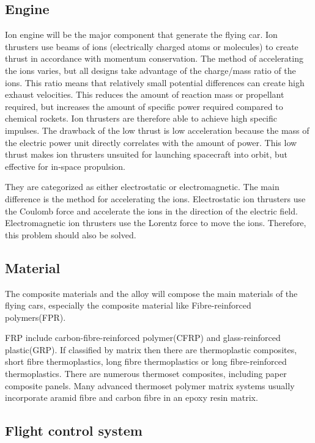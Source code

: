 \subsection{Engine}

Ion engine will be the major component that generate the flying car. Ion thrusters use beams of ions (electrically charged atoms or molecules) to create thrust in accordance with momentum conservation. The method of accelerating the ions varies, but all designs take advantage of the charge/mass ratio of the ions. This ratio means that relatively small potential differences can create high exhaust velocities. This reduces the amount of reaction mass or propellant required, but increases the amount of specific power required compared to chemical rockets. Ion thrusters are therefore able to achieve high specific impulses. The drawback of the low thrust is low acceleration because the mass of the electric power unit directly correlates with the amount of power. This low thrust makes ion thrusters unsuited for launching spacecraft into orbit, but effective for in-space propulsion. 

They are categorized as either electrostatic or electromagnetic. The main difference is the method for accelerating the ions. Electrostatic ion thrusters use the Coulomb force and accelerate the ions in the direction of the electric field. Electromagnetic ion thrusters use the Lorentz force to move the ions. Therefore, this problem should also be solved.

\subsection{Material}

The composite materials and the alloy will compose the main materials of the flying cars, especially the composite material like Fibre-reinforced polymers(FPR).

FRP include carbon-fibre-reinforced polymer(CFRP) and glass-reinforced plastic(GRP). If classified by matrix then there are thermoplastic composites, short fibre thermoplastics, long fibre thermoplastics or long fibre-reinforced thermoplastics. There are numerous thermoset composites, including paper composite panels. Many advanced thermoset polymer matrix systems usually incorporate aramid fibre and carbon fibre in an epoxy resin matrix.

\subsection{Flight control system}

